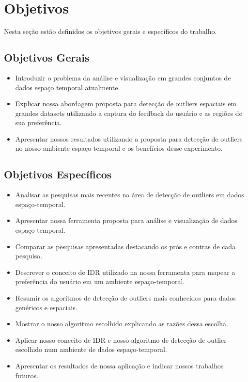 \section{Objetivos}

Nesta seção estão definidos os objetivos gerais e específicos do trabalho.

\subsection{Objetivos Gerais}

\begin{itemize}
	\item
	      Introduzir o problema da análise e visualização em grandes conjuntos de dados espaço temporal atualmente.
	\item
	      Explicar nossa abordagem proposta para detecção de outliers espaciais em grandes datasets utilizando a captura do feedback do usuário e as regiões de sua preferência.
	\item
	      Apresentar nossos resultados utilizando a proposta para detecção de outliers no nosso ambiente espaço-temporal e os benefícios desse experimento.

\end{itemize}

\subsection{Objetivos Específicos}

\begin{itemize}
	\item
	      Analisar as pesquisas mais recentes na área de detecção de outliers em dados espaço-temporal.
	\item
	      Apresentar nossa ferramenta proposta para análise e visualização de dados espaço-temporal.
	\item
	      Comparar as pesquisas apresentadas destacando os prós e contras de cada pesquisa.
	\item
	      Descrever o conceito de IDR utilizado na nossa ferramenta para mapear a preferência do usuário em um ambiente espaço-temporal.
	\item
	      Resumir os algoritmos de detecção de outliers mais conhecidos para dados genéricos e espaciais.
	\item
	      Mostrar o nosso algoritmo escolhido explicando as razões dessa escolha.
	\item
	      Aplicar nosso conceito de IDR e nosso algoritmo de detecção de outlier escolhido num ambiente de dados espaço-temporal.
	\item
	      Apresentar os resultados de nossa aplicação e indicar nossos trabalhos futuros.

\end{itemize}

